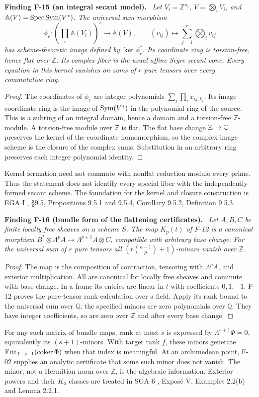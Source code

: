 \documentclass[11pt]{article}
\newcommand{\Z}{\mathbb Z}\newcommand{\Q}{\mathbb Q}
\newcommand{\Spec}{\operatorname{Spec}}\newcommand{\rank}{\operatorname{rank}}
\newenvironment{finding}[2]{\par\medskip\noindent\textbf{Finding #1 (#2).}\ \itshape}{\par\medskip}
\begin{document}
\begin{finding}{F-15}{an integral secant model}
Let $V_i=\Z^{n_i}$, $V=\bigotimes_iV_i$, and
$\mathbb A(V)=\Spec\Sym(V^*)$. The universal sum morphism
\[
 \phi_r:\left(\prod_i\mathbb A(V_i)\right)^r\longrightarrow\mathbb A(V),
 \qquad(v_{ij})\longmapsto\sum_{j=1}^r\bigotimes_i v_{ij}
\]
has scheme-theoretic image defined by $\ker\phi_r^*$.
Its coordinate ring is torsion-free, hence flat over $\Z$.
Its complex fiber is the usual affine Segre secant cone.
Every equation in this kernel vanishes on sums of $r$ pure
tensors over every commutative ring.
\end{finding}
\begin{proof}
The coordinates of $\phi_r$ are integer polynomials
$\sum_j\prod_i x_{ij,k_i}$. Its image coordinate ring is the
image of $\operatorname{Sym}(V^*)$ in the polynomial ring of the source.
This is a subring of an integral domain, hence a domain and a
torsion-free $\Z$-module. A torsion-free module over $\Z$ is flat.
The flat base change $\Z\to\C$ preserves the kernel of the
coordinate homomorphism, so the complex image scheme is the
closure of the complex sums. Substitution in an arbitrary ring
preserves each integer polynomial identity.
\end{proof}
Kernel formation need not commute with nonflat reduction modulo
every prime. Thus the statement does not identify every special
fiber with the independently formed secant scheme. The foundation
for the kernel and closure construction is EGA I \cite{EGA1},
\S9.5, Propositions 9.5.1 and 9.5.4, Corollary 9.5.2,
Definition 9.5.3.

\begin{finding}{F-16}{bundle form of the flattening certificates}
Let $A,B,C$ be finite locally free sheaves on a scheme $S$.
The map $K_p(t)$ of F-12 is a canonical morphism
$B^*\otimes\Lambda^p A\to\Lambda^{p+1}A\otimes C$,
compatible with arbitrary base change.
For the universal sum of $r$ pure tensors all
$(r\binom{a-1}p+1)$-minors vanish over $\Z$.
\end{finding}
\begin{proof}
The map is the composition of contraction, tensoring with
$\Lambda^p A$, and exterior multiplication. All are canonical
for locally free sheaves and commute with base change.
In a frame its entries are linear in $t$ with coefficients
$0,1,-1$. F-12 proves the pure-tensor rank calculation over
a field. Apply its rank bound to the universal sum over $\Q$;
the specified minors are zero polynomials over $\Q$.
They have integer coefficients, so are zero over $\Z$ and
after every base change.
\end{proof}
For any such matrix of bundle maps, rank at most $s$ is expressed
by $\Lambda^{s+1}\Phi=0$, equivalently its $(s+1)$-minors.
With target rank $f$, these minors generate
$\operatorname{Fitt}_{f-s-1}(\operatorname{coker}\Phi)$ when that index is meaningful.
At an archimedean point, F-02 supplies an analytic certificate
that some such minor does not vanish. The minor, not a
Hermitian norm over $\Z$, is the algebraic information.
Exterior powers and their $K_0$ classes are treated in
SGA 6 \cite{SGA6}, Expos\'e V, Examples 2.2(b) and Lemma 2.2.1.
\end{document}
